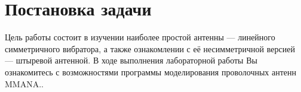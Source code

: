 \section*{Постановка задачи}
Цель работы состоит в изучении наиболее простой антенны — линейного симметричного вибратора, а также ознакомлении с её несимметричной версией — штыревой
антенной. В ходе выполнения лабораторной работы Вы ознакомитесь с возможностями
программы моделирования проволочных антенн MMANA..
